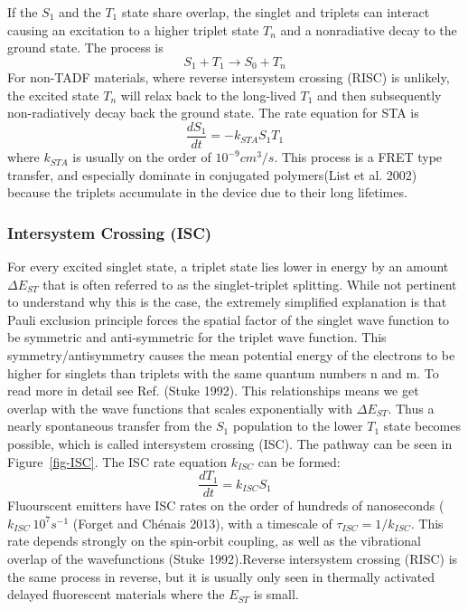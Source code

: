 \documentclass[
  letterpaper,
  DIV=11,
  numbers=noendperiod,
  oneside]{scrreprt}
\begin{document}
If the \(S_1\) and the \(T_1\) state share overlap, the singlet and
triplets can interact causing an excitation to a higher triplet state
\(T_n\) and a nonradiative decay to the ground state. The process is
\[S_1 + T_1 \rightarrow S_0 + T_n\] For non-TADF materials, where
reverse intersystem crossing (RISC) is unlikely, the excited state
\(T_n\) will relax back to the long-lived \(T_1\) and then subsequently
non-radiatively decay back the ground state. The rate equation for STA
is \[\frac{dS_1}{dt} = -k_{STA}S_1T_1\] where \(k_{STA}\) is usually on
the order of \(10^{-9} cm^3/s\). This process is a FRET type transfer,
and especially dominate in conjugated polymers(List et al. 2002) because
the triplets accumulate in the device due to their long lifetimes.

\hypertarget{intersystem-crossing-isc}{%
\subsubsection{Intersystem Crossing
(ISC)}\label{intersystem-crossing-isc}}

For every excited singlet state, a triplet state lies lower in energy by
an amount \(\Delta E_{ST}\) that is often referred to as the
singlet-triplet splitting. While not pertinent to understand why this is
the case, the extremely simplified explanation is that Pauli exclusion
principle forces the spatial factor of the singlet wave function to be
symmetric and anti-symmetric for the triplet wave function. This
symmetry/antisymmetry causes the mean potential energy of the electrons
to be higher for singlets than triplets with the same quantum numbers n
and m. To read more in detail see Ref. (Stuke 1992). This relationships
means we get overlap with the wave functions that scales exponentially
with \(\Delta E_{ST}\). Thus a nearly spontaneous transfer from the
\(S_1\) population to the lower \(T_1\) state becomes possible, which is
called intersystem crossing (ISC). The pathway can be seen in
Figure~\ref{fig-ISC}. The ISC rate equation \(k_{ISC}\) can be formed:
\[\frac{dT_1}{dt} = k_{ISC}S_1\] Fluourscent emitters have ISC rates on
the order of hundreds of nanoseconds (\(k_{ISC} ~ 10^7s^{-1}\) (Forget
and Chénais 2013), with a timescale of \(\tau_{ISC} = 1/k_{ISC}\). This
rate depends strongly on the spin-orbit coupling, as well as the
vibrational overlap of the wavefunctions (Stuke 1992).Reverse
intersystem crossing (RISC) is the same process in reverse, but it is
usually only seen in thermally activated delayed fluorescent materials
where the \(E_{ST}\) is small.
\end{document}
